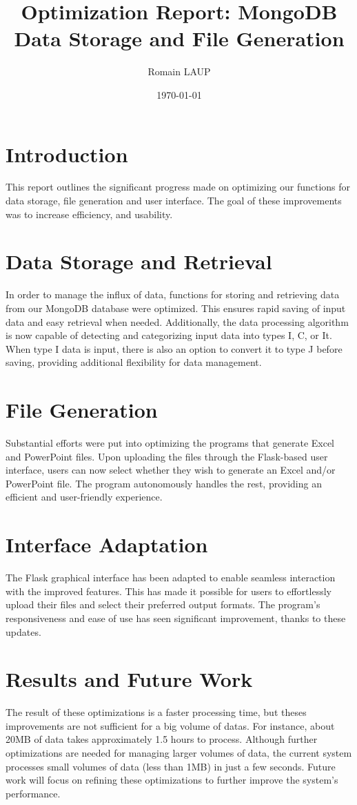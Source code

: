 \documentclass[11pt]{article}
\title{Optimization Report: MongoDB Data Storage and File Generation}
\author{Romain LAUP}
\date{\today}
\begin{document}
\maketitle

\section{Introduction}
This report outlines the significant progress made on optimizing our functions for data storage, file generation and user interface. The goal of these improvements was to increase efficiency, and usability.

\section{Data Storage and Retrieval}
In order to manage the influx of data, functions for storing and retrieving data from our MongoDB database were optimized. This ensures rapid saving of input data and easy retrieval when needed. Additionally, the data processing algorithm is now capable of detecting and categorizing input data into types I, C, or It. When type I data is input, there is also an option to convert it to type J before saving, providing additional flexibility for data management.

\section{File Generation}
Substantial efforts were put into optimizing the programs that generate Excel and PowerPoint files. Upon uploading the files through the Flask-based user interface, users can now select whether they wish to generate an Excel and/or PowerPoint file. The program autonomously handles the rest, providing an efficient and user-friendly experience.

\section{Interface Adaptation}
The Flask graphical interface has been adapted to enable seamless interaction with the improved features. This has made it possible for users to effortlessly upload their files and select their preferred output formats. The program's responsiveness and ease of use has seen significant improvement, thanks to these updates.

\section{Results and Future Work}
The result of these optimizations is a faster processing time, but theses improvements are not sufficient for a big volume of datas. For instance, about 20MB of data takes approximately 1.5 hours to process. Although further optimizations are needed for managing larger volumes of data, the current system processes small volumes of data (less than 1MB) in just a few seconds. Future work will focus on refining these optimizations to further improve the system's performance.
\end{document}

